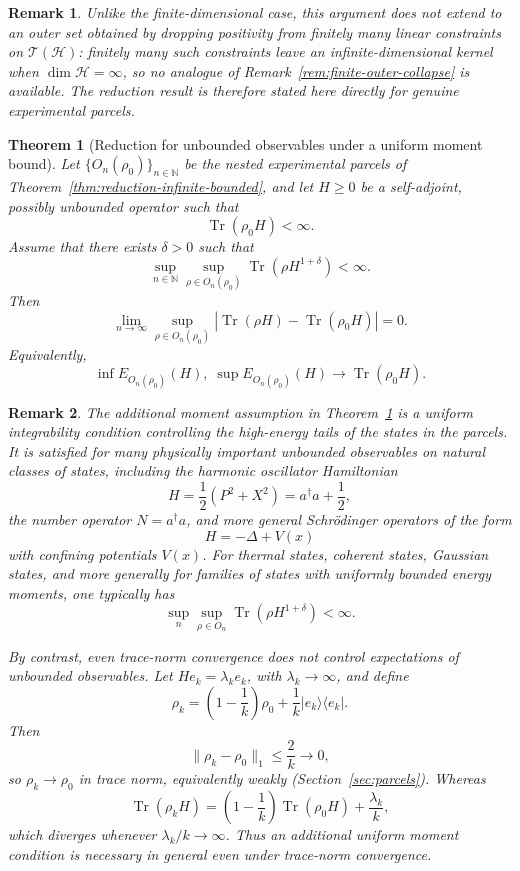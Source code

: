 \documentclass[11pt, onecolumn]{article}
\newtheorem{theorem}{Theorem}
\newtheorem{remark}{Remark}
\begin{document}
\begin{remark}
\label{rem:no-infinite-outer}
Unlike the finite-dimensional case, this argument does not extend to an outer set obtained by dropping positivity from finitely many linear constraints on $\mathcal T(\mathcal H)$: finitely many such constraints leave an infinite-dimensional kernel when $\dim\mathcal H=\infty$, so no analogue of Remark~\ref{rem:finite-outer-collapse} is available. The reduction result is therefore stated here directly for genuine experimental parcels.
\end{remark}

\begin{theorem}[Reduction for unbounded observables under a uniform moment bound]
\label{thm:unbounded-moment}
Let $\{O_n(\rho_0)\}_{n\in\mathbb N}$ be the nested experimental parcels of
Theorem~\ref{thm:reduction-infinite-bounded}, and let $H\ge 0$ be a
self-adjoint, possibly unbounded operator such that
\[
\operatorname{Tr}(\rho_0H)<\infty.
\]
Assume that there exists $\delta>0$ such that
\[
\sup_{n\in\mathbb N}\sup_{\rho\in O_n(\rho_0)}
\operatorname{Tr}(\rho H^{1+\delta})<\infty.
\]
Then
\[
\lim_{n\to\infty}
\sup_{\rho\in O_n(\rho_0)}
\left|
\operatorname{Tr}(\rho H)-\operatorname{Tr}(\rho_0H)
\right|=0.
\]
Equivalently,
\[
\inf E_{O_n(\rho_0)}(H),\;
\sup E_{O_n(\rho_0)}(H)
\longrightarrow
\operatorname{Tr}(\rho_0H).
\]
\end{theorem}

\begin{remark}
The additional moment assumption in Theorem~\ref{thm:unbounded-moment}
is a uniform integrability condition controlling the high-energy tails of the
states in the parcels. It is satisfied for many physically important
unbounded observables on natural classes of states, including the harmonic
oscillator Hamiltonian
\[
H=\frac12(P^2+X^2)=a^\dagger a+\frac12,
\]
the number operator \(N=a^\dagger a\), and more general Schr\"odinger
operators of the form
\[
H=-\Delta+V(x)
\]
with confining potentials \(V(x)\). For thermal states, coherent states,
Gaussian states, and more generally for families of states with uniformly
bounded energy moments, one typically has
\[
\sup_n\sup_{\rho\in O_n}\operatorname{Tr}(\rho H^{1+\delta})<\infty.
\]

By contrast, even trace-norm convergence does not control expectations of
unbounded observables. Let \(H e_k=\lambda_k e_k\), with
\(\lambda_k\to\infty\), and define
\[
\rho_k=
\left(1-\frac1k\right)\rho_0
+
\frac1k|e_k\rangle\langle e_k|.
\]
Then
\[
\|\rho_k-\rho_0\|_1
\le \frac{2}{k}\to0,
\]
so $\rho_k\to\rho_0$ in trace norm, equivalently weakly (Section~\ref{sec:parcels}). Whereas
\[
\operatorname{Tr}(\rho_kH)
=
\left(1-\frac1k\right)\operatorname{Tr}(\rho_0H)
+
\frac{\lambda_k}{k},
\]
which diverges whenever $\lambda_k/k\to\infty$. Thus an additional
uniform moment condition is necessary in general even under trace-norm
convergence.
\end{remark}
\end{document}
